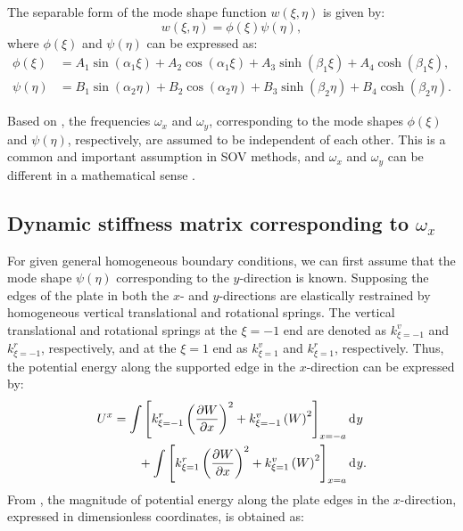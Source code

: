\documentclass[preprint,12pt,number]{elsarticle}
\newcommand{\id}{\mathrm{d}\mkern1mu}
\begin{document}
The separable form of the mode shape function $ w(\xi, \eta)$ is given by:
%
\begin{equation}\label{eq:displace_func}
w(\xi, \eta) = \phi(\xi) \psi(\eta),
\end{equation}
%
where $ \phi(\xi) $ and $\psi(\eta) $ can be expressed as:
\begin{subequations}\label{eq:phi_psi_solution}
\begin{align}
	\phi(\xi) &= A_1 \sin{(\alpha_1 \xi)} + A_2 \cos{(\alpha_1 \xi)} + A_3 \sinh{(\beta_1 \xi)} + A_4 \cosh{(\beta_1 \xi)},\label{eq:phi_solution1}\\
	\psi(\eta) &= B_1 \sin{(\alpha_2 \eta)} + B_2 \cos{(\alpha_2 \eta)} + B_3 \sinh{(\beta_2 \eta)} + B_4 \cosh{(\beta_2 \eta)}. \label{eq:phi_solution2}
\end{align}
\end{subequations}

Based on , the frequencies $\omega_x$ and $\omega_y$, corresponding to the mode shapes $\phi(\xi)$ and $\psi(\eta)$, respectively, are assumed to be independent of each other.
This is a common and important assumption in SOV methods, and $\omega_x$ and $\omega_y$ can be different in a mathematical sense \cite{xing2020extended}.

\subsection{Dynamic stiffness matrix corresponding to $\omega_x$}\label{sec:DSMx}
For given general homogeneous boundary conditions, we can first assume that the mode shape $\psi(\eta)$ corresponding to the $y$-direction is known. 
Supposing the edges of the plate in both the $x$- and $y$-directions are elastically restrained by homogeneous vertical translational and rotational springs.
The vertical translational and rotational springs at the $\xi = -1$ end are denoted as $k^v_{\xi = -1}$ and $k^r_{\xi = -1}$, respectively, and at the $\xi = 1$ end as $k^v_{\xi = 1}$ and $k^r_{\xi = 1}$, respectively. 
Thus, the potential energy along the supported edge in the $x$-direction can be expressed by:
%
\begin{equation}\label{eq:poten_energy_edgex}
\begin{split}
	U^{x} &=  \int\left[k^r_{\xi=-1} \left( \frac{\partial W}{\partial x} \right)^2 + k^v_{\xi=-1} \left( W \right)^2\right]_{x=-a} \id y\\
	&\qquad +  \int\left[k^r_{\xi=1} \left( \frac{\partial W}{\partial x} \right)^2 + k^v_{\xi=1} \left( W \right)^2\right]_{x=a} \id y.
\end{split}
\end{equation}
%
From , the magnitude of potential energy along the plate edges in the $x$-direction, expressed in dimensionless coordinates, is obtained as:
\end{document}
